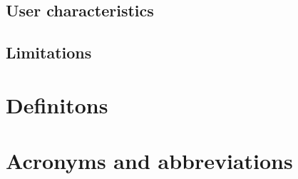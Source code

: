 \documentclass{scrreprt}
\begin{document}


\subsection{User characteristics}
%


\subsection{Limitations}


\section{Definitons}

\section{Acronyms and abbreviations}
\end{document}
